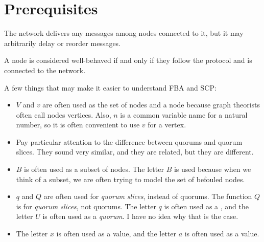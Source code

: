 \section{Prerequisites}

\begin{defn}[Network]\label{defn_network}
    The network delivers any messages among nodes connected to it, but it may arbitrarily delay or reorder messages.
\end{defn}

\begin{defn}
    A node is considered well-behaved if and only if they follow the protocol and is connected to the network.
\end{defn}

\begin{rem}
    A few things that may make it easier to understand FBA and SCP:
    \begin{itemize}
        \item
            $V$ and $v$ are often used as the set of nodes and a node because graph theorists often call nodes vertices.
            Also, $n$ is a common variable name for a natural number, so it is often convenient to use $v$ for a vertex.
        \item
            Pay particular attention to the difference between quorums and quorum slices.
            They sound very similar, and they are related, but they are different.
        \item
            $B$ is often used as a subset of nodes.
            The letter $B$ is used because when we think of a subset, we are often trying to model the set of befouled nodes.
        \item
            $q$ and $Q$ are often used for \textit{quorum slices}, instead of quorums.
            The function $Q$ is for \textit{quorum slices}, not quorums.
            The letter $q$ is often used as a , and the letter $U$ is often used as a \textit{quorum}.
            I have no idea why that is the case.
        \item
            The letter $x$ is often used as a value, and the letter $a$ is often used as a value.
    \end{itemize}
\end{rem}
